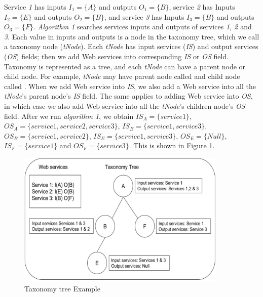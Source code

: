 \begin{example}
\noindent
Service \emph{1} has inputs $I_1 = \{A\}$ and outputs $O_1 = \{B\}$, service \emph{2} has Inputs $I_2 = \{E\}$  and outputs $O_2 = \{B\}$, and service \emph{3} has Inputs $I_3 = \{B\}$  and outputs $O_3 = \{F\}$. \emph{Algorithm 1} searches services inputs and outputs of services \emph{1, 2} and \emph{3}. Each value in inputs and outputs is a node in the taxonomy tree, which we call a taxonomy node (\emph{tNode}). Each \emph{tNode} has input services (\emph{IS}) and output services (\emph{OS}) fields; then we add Web services into corresponding \emph{IS} or \emph{OS} field. Taxonomy is represented as a tree, and each \emph{tNode} can have a parent node or child node. For example,  \emph{tNode} may have parent node called  and child node called . When we add Web service into \emph{IS}, we also add a Web service into all the \emph{tNode}'s parent node's \emph{IS} field. The same applies to adding Web service into \emph{OS}, in which case we also add Web service into all the \emph{tNode}'s children node's \emph{OS} field. After we run \emph{algorithm 1}, we obtain $IS_A = \{service 1\}$, $OS_A = \{service 1, service 2, service 3\}$, $IS_B = \{service 1, service 3\}$, $OS_B = \{service 1, service 2\}$, $IS_E = \{service 1, service 3\}$, $OS_E = \{Null\}$, $IS_F = \{service 1\}$ and $OS_F = \{service 3\}$. This is shown in Figure \ref{fig:taxonomyTree}. \par

\end{example}

\begin{figure}[H]
\includegraphics[width = 10cm]{taxonomy-tree-example.pdf}
\centering
\caption{Taxonomy tree Example}
\label{fig:taxonomyTree} 
\end{figure} 

